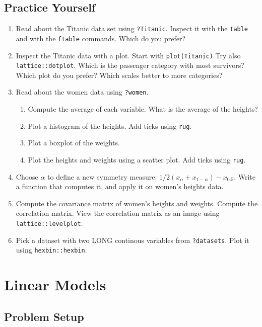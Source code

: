 \documentclass[]{book}
\providecommand{\tightlist}{%
  \setlength{\itemsep}{0pt}\setlength{\parskip}{0pt}}
\theoremstyle{definition}
\theoremstyle{definition}
\theoremstyle{definition}
\theoremstyle{remark}
\begin{document}
\section{Practice Yourself}\label{practice-yourself-2}

\begin{enumerate}
\def\labelenumi{\arabic{enumi}.}
\item
  Read about the Titanic data set using \texttt{?Titanic}. Inspect it
  with the \texttt{table} and with the \texttt{ftable} commands. Which
  do you prefer?
\item
  Inspect the Titanic data with a plot. Start with
  \texttt{plot(Titanic)} Try also \texttt{lattice::dotplot}. Which is
  the passenger category with most survivors? Which plot do you prefer?
  Which scales better to more categories?
\item
  Read about the women data using \texttt{?women}.

  \begin{enumerate}
  \def\labelenumii{\arabic{enumii}.}
  \tightlist
  \item
    Compute the average of each variable. What is the average of the
    heights?
  \item
    Plot a histogram of the heights. Add ticks using \texttt{rug}.
  \item
    Plot a boxplot of the weights.
  \item
    Plot the heights and weights using a scatter plot. Add ticks using
    \texttt{rug}.
  \end{enumerate}
\item
  Choose \(\alpha\) to define a new symmetry measure:
  \(1/2(x_\alpha+x_{1-\alpha})-x_{0.5}\). Write a function that computes
  it, and apply it on women's heights data.
\item
  Compute the covariance matrix of women's heights and weights. Compute
  the correlation matrix. View the correlation matrix as an image using
  \texttt{lattice::levelplot}.
\item
  Pick a dataset with two LONG continous variables from
  \texttt{?datasets}. Plot it using \texttt{hexbin::hexbin}.
\end{enumerate}

\chapter{Linear Models}\label{lm}

\section{Problem Setup}\label{problem-setup}
\end{document}
